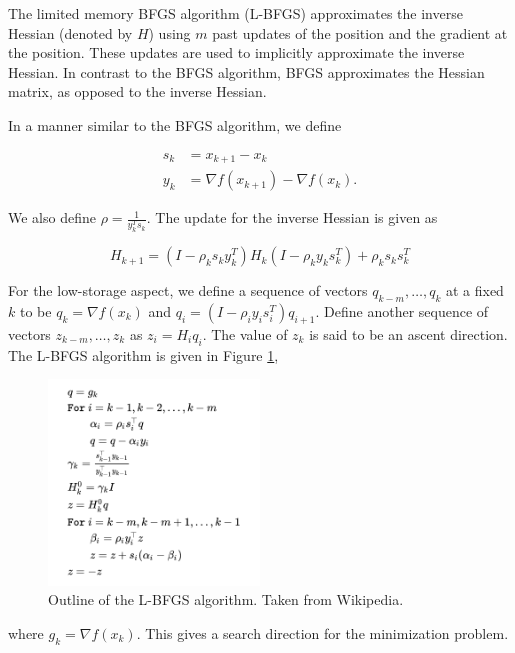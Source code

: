 
The limited memory BFGS algorithm (L-BFGS) approximates the inverse Hessian (denoted by $H$) using $m$ past updates of 
the position and the gradient at the position. These updates are used to implicitly approximate the inverse Hessian. In 
contrast to the BFGS algorithm, BFGS approximates the Hessian matrix, as opposed to the inverse Hessian.


In a manner similar to the BFGS algorithm, we define

\begin{align*}
    s_k &= x_{k+1} - x_k\\
    y_k &= \nabla f(x_{k+1}) - \nabla f(x_k).
\end{align*}

We also define $\rho = \frac{1}{y_k^Ts_k}$. The update for the inverse Hessian is given as

$$
    H_{k+1} = (I - \rho_ks_ky_k^T)H_k(I - \rho_ky_ks_k^T) + \rho_ks_ks_k^T
$$

For the low-storage aspect, we define a sequence of vectors $q_{k-m}, \dots, q_k$ at a fixed $k$ to be 
$q_k = \nabla f(x_k)$ and $q_i = (I - \rho_iy_is_i^T)q_{i+1}$. Define another sequence of vectors $z_{k-m},\dots, z_k$ 
as $z_i = H_iq_i$. The value of $z_k$ is said to be an ascent direction. The L-BFGS algorithm is given in Figure 
\ref{fig:L-BFGS-Algorithm},

\pagebreak

\begin{figure}[h]
    \centering
    \includegraphics[width=0.5\textwidth]{images/L-BFGS-Algorithm.png}
    \caption{Outline of the L-BFGS algorithm. Taken from Wikipedia.}
    \label{fig:L-BFGS-Algorithm}
\end{figure}

where $g_k = \nabla f(x_k)$. This gives a search direction for the minimization problem.